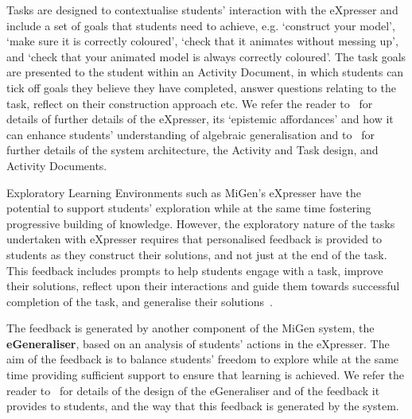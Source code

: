 Tasks are designed to contextualise students' interaction with the
eXpresser and include a set of goals that students need to achieve,
e.g. `construct your model', `make sure it is correctly coloured',
`check that it animates without messing up', and `check that your
animated model is always correctly coloured'. The task goals are
presented to the student within an Activity Document, in which
students can tick off goals they believe they have completed, answer
questions relating to the task, reflect on their construction approach
etc. We refer the reader to~\cite{Manolis2012Sowing} for details of 
further details of the eXpresser, its `epistemic
affordances' and how it can enhance
 students’ understanding of algebraic generalisation and to~\cite{MiGen-CAE} for further details
of the system architecture, the Activity and Task design, and Activity Documents.  

Exploratory Learning Environments such as MiGen's eXpresser
have the potential to support students' exploration while at the same
time fostering progressive building of knowledge. However, the
exploratory nature of the tasks undertaken with eXpresser requires
that personalised feedback is provided to students as they construct
their solutions, and not just at the end of the task. This feedback
includes prompts to help students engage with a task, improve their
solutions, reflect upon their interactions and guide them towards
successful completion of the task, and generalise their 
solutions~\cite{MiGen-CAE,MiGen-JRPIT}. 

The feedback is generated by another
component of the MiGen system, the {\bf eGeneraliser}, based on an
analysis of students’ actions in the eXpresser. %
%
The aim of the
feedback is to balance students' freedom to explore while at the same
time providing sufficient support to ensure that learning is
achieved. We refer the reader to~\cite{MiGen-JRPIT} for
details of the design of the eGeneraliser and of the feedback it
provides to students, and the way that this feedback is generated by
the system.  


 
